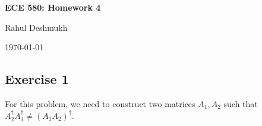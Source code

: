 \documentclass[11pt]{article}
\newcommand{\mat}[1]{\begin{bmatrix}#1\end{bmatrix}}
\begin{document}
\begin{center}
\Large{\textbf{ECE 580: Homework 4}}

Rahul Deshmukh

\today
\end{center}



\subsection*{Exercise 1} 
For this problem, we need to construct two matrices $A_1,A_2$ such that $A_2^{\dagger}A_1^{\dagger} \neq (A_1A_2)^{\dagger} $.

% 
\end{document}
